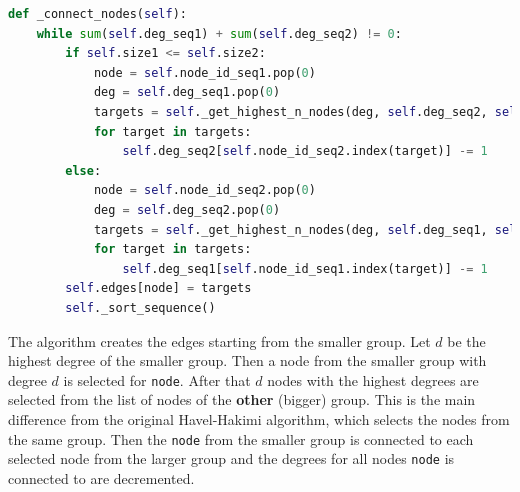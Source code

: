 \begin{lstlisting}[language=python, caption={Modified Havel-Hakimi algorithm}, label={lst:modified_havel_hakimi}]
def _connect_nodes(self):
    while sum(self.deg_seq1) + sum(self.deg_seq2) != 0:
        if self.size1 <= self.size2:
            node = self.node_id_seq1.pop(0)
            deg = self.deg_seq1.pop(0)
            targets = self._get_highest_n_nodes(deg, self.deg_seq2, self.node_id_seq2)
            for target in targets:
                self.deg_seq2[self.node_id_seq2.index(target)] -= 1
        else:
            node = self.node_id_seq2.pop(0)
            deg = self.deg_seq2.pop(0)
            targets = self._get_highest_n_nodes(deg, self.deg_seq1, self.node_id_seq1)
            for target in targets:
                self.deg_seq1[self.node_id_seq1.index(target)] -= 1
        self.edges[node] = targets
        self._sort_sequence()
\end{lstlisting}

The algorithm creates the edges starting from the smaller group. Let $d$ be the highest degree of the smaller group. Then a node from the smaller group with degree $d$ is selected for \texttt{node}. After that $d$ nodes with the highest degrees are selected from the list of nodes of the \textbf{other} (bigger) group. This is the main difference from the original Havel-Hakimi algorithm, which selects the nodes from the same group. Then the \texttt{node} from the smaller group is connected to each selected node from the larger group and the degrees for all nodes \texttt{node} is connected to are decremented.